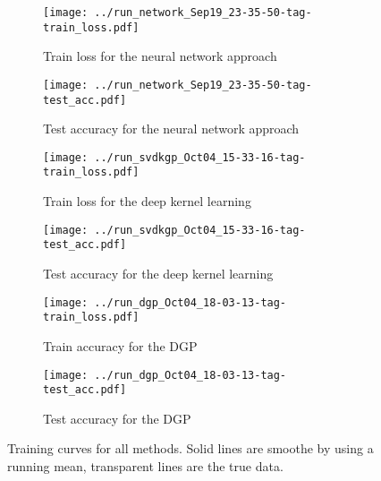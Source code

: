 \begin{figure}[tb]
    \centering
    \begin{subfigure}[c]{0.49\textwidth}
        \texttt{[image: ../run\_network\_Sep19\_23-35-50-tag-train\_loss.pdf]}
        \caption{Train loss for the neural network approach}
    \end{subfigure}
    \begin{subfigure}[c]{0.49\textwidth}
        \texttt{[image: ../run\_network\_Sep19\_23-35-50-tag-test\_acc.pdf]}
        \caption{Test accuracy for the neural network approach}
    \end{subfigure}

    \begin{subfigure}[c]{0.49\textwidth}
        \texttt{[image: ../run\_svdkgp\_Oct04\_15-33-16-tag-train\_loss.pdf]}
        \caption{Train loss for the deep kernel learning}
    \end{subfigure}
    \begin{subfigure}[c]{0.49\textwidth}
        \texttt{[image: ../run\_svdkgp\_Oct04\_15-33-16-tag-test\_acc.pdf]}
        \caption{Test accuracy for the deep kernel learning}
    \end{subfigure}

    \begin{subfigure}[c]{0.49\textwidth}
        \texttt{[image: ../run\_dgp\_Oct04\_18-03-13-tag-train\_loss.pdf]}
        \caption{Train accuracy for the DGP}
    \end{subfigure}
    \begin{subfigure}[c]{0.49\textwidth}
        \texttt{[image: ../run\_dgp\_Oct04\_18-03-13-tag-test\_acc.pdf]}
        \caption{Test accuracy for the DGP}
    \end{subfigure}
    \caption{Training curves for all methods. Solid lines are smoothe by using
    a running mean, transparent lines are the true data.}
    \label{fig:train}
\end{figure}
